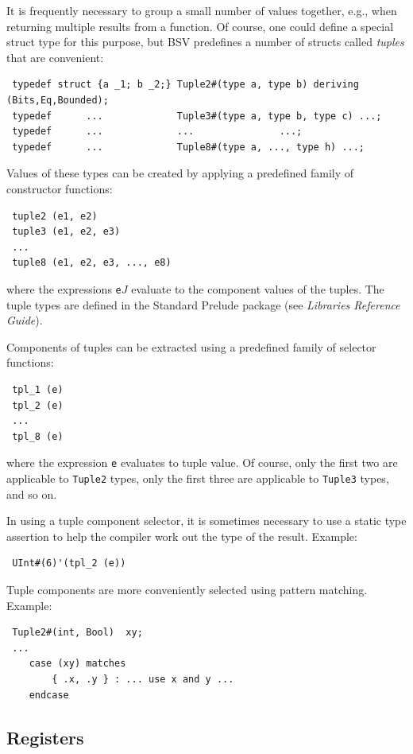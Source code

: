 \documentclass[twoside,letterpaper]{article}
\newcommand{\LibRefGuide}{\emph{Libraries Reference Guide}}
\newcommand{\BSV}{BSV}
\begin{document}
 It is frequently necessary to
group a small number of values together, e.g., when returning multiple
results from a function.  Of course, one could define a special struct
type for this purpose, but {\BSV} predefines a number of structs
called \emph{tuples} that are convenient:
\begin{verbatim}
 typedef struct {a _1; b _2;} Tuple2#(type a, type b) deriving (Bits,Eq,Bounded);
 typedef      ...             Tuple3#(type a, type b, type c) ...;
 typedef      ...             ...               ...;
 typedef      ...             Tuple8#(type a, ..., type h) ...;
\end{verbatim}
Values of these types can be created by applying a predefined family of
constructor functions:
\begin{verbatim}
 tuple2 (e1, e2)
 tuple3 (e1, e2, e3)
 ...
 tuple8 (e1, e2, e3, ..., e8)
\end{verbatim}
where the expressions \texttt{e$J$} evaluate to the component values
of the tuples.  The tuple types are defined in the Standard Prelude
package (see {\LibRefGuide}).

Components of tuples can be extracted using a predefined family of
selector functions:
\begin{verbatim}
 tpl_1 (e)
 tpl_2 (e)
 ...
 tpl_8 (e)
\end{verbatim}
where the expression \texttt{e} evaluates to tuple value.  Of course,
only the first two are applicable to \texttt{Tuple2} types, only the
first three are applicable to \texttt{Tuple3} types, and so on.

In using a tuple component selector, it is sometimes necessary to use
a static type assertion to help the compiler work out the type of the
result.  Example:
\begin{verbatim}
 UInt#(6)'(tpl_2 (e))
\end{verbatim}

Tuple components are more conveniently selected using pattern matching.
Example:
\begin{verbatim}
 Tuple2#(int, Bool)  xy;
 ...
    case (xy) matches
        { .x, .y } : ... use x and y ...
    endcase
\end{verbatim}


\subsection{Registers}
\end{document}
